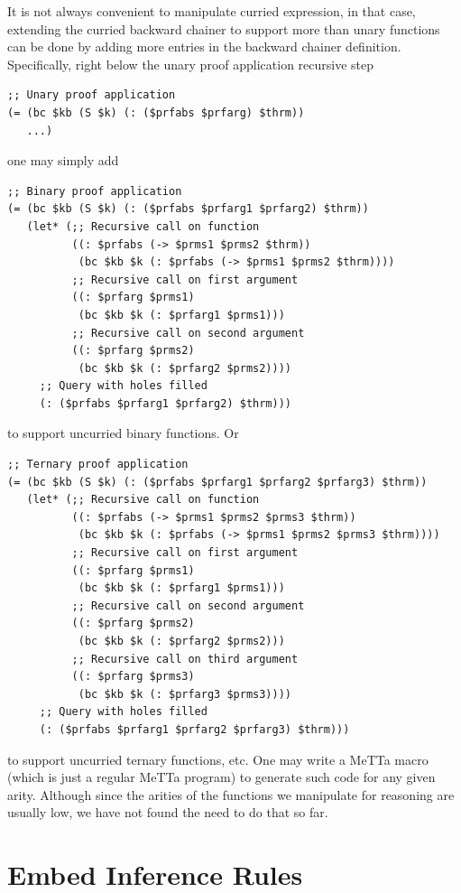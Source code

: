 \documentclass[]{report}
\begin{document}
It is not always convenient to manipulate curried expression, in that
case, extending the curried backward chainer to support more than
unary functions can be done by adding more entries in the backward
chainer definition.  Specifically, right below the unary proof
application recursive step
\begin{verbatim}
;; Unary proof application
(= (bc $kb (S $k) (: ($prfabs $prfarg) $thrm))
   ...)
\end{verbatim}
one may simply add
\begin{verbatim}
;; Binary proof application
(= (bc $kb (S $k) (: ($prfabs $prfarg1 $prfarg2) $thrm))
   (let* (;; Recursive call on function
          ((: $prfabs (-> $prms1 $prms2 $thrm))
           (bc $kb $k (: $prfabs (-> $prms1 $prms2 $thrm))))
          ;; Recursive call on first argument
          ((: $prfarg $prms1)
           (bc $kb $k (: $prfarg1 $prms1)))
          ;; Recursive call on second argument
          ((: $prfarg $prms2)
           (bc $kb $k (: $prfarg2 $prms2))))
     ;; Query with holes filled
     (: ($prfabs $prfarg1 $prfarg2) $thrm)))
\end{verbatim}
to support uncurried binary functions.  Or
\begin{verbatim}
;; Ternary proof application
(= (bc $kb (S $k) (: ($prfabs $prfarg1 $prfarg2 $prfarg3) $thrm))
   (let* (;; Recursive call on function
          ((: $prfabs (-> $prms1 $prms2 $prms3 $thrm))
           (bc $kb $k (: $prfabs (-> $prms1 $prms2 $prms3 $thrm))))
          ;; Recursive call on first argument
          ((: $prfarg $prms1)
           (bc $kb $k (: $prfarg1 $prms1)))
          ;; Recursive call on second argument
          ((: $prfarg $prms2)
           (bc $kb $k (: $prfarg2 $prms2)))
          ;; Recursive call on third argument
          ((: $prfarg $prms3)
           (bc $kb $k (: $prfarg3 $prms3))))
     ;; Query with holes filled
     (: ($prfabs $prfarg1 $prfarg2 $prfarg3) $thrm)))
\end{verbatim}
to support uncurried ternary functions, etc.  One may write a MeTTa
macro (which is just a regular MeTTa program) to generate such code
for any given arity.  Although since the arities of the functions we
manipulate for reasoning are usually low, we have not found the need
to do that so far.

\section{Embed Inference Rules}
\end{document}

